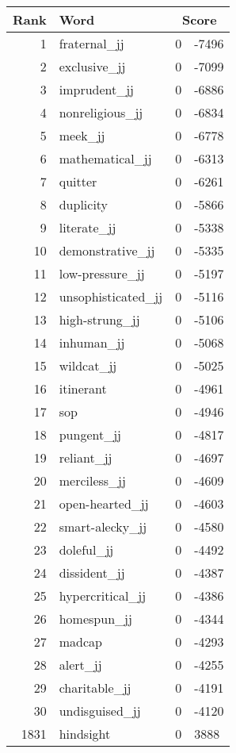 \begin{longtable}[!htbp]{| rlr@{.}l |}
    \hline
    \textbf{Rank} & \textbf{Word} & \multicolumn{2}{c|}{\textbf{Score}} \\
    \hline
    \endhead
    1 & fraternal\_jj & 0 & -7496 \\
    2 & exclusive\_jj & 0 & -7099 \\
    3 & imprudent\_jj & 0 & -6886 \\
    4 & nonreligious\_jj & 0 & -6834 \\
    5 & meek\_jj & 0 & -6778 \\
    6 & mathematical\_jj & 0 & -6313 \\
    7 & quitter & 0 & -6261 \\
    8 & duplicity & 0 & -5866 \\
    9 & literate\_jj & 0 & -5338 \\
    10 & demonstrative\_jj & 0 & -5335 \\
    11 & low-pressure\_jj & 0 & -5197 \\
    12 & unsophisticated\_jj & 0 & -5116 \\
    13 & high-strung\_jj & 0 & -5106 \\
    14 & inhuman\_jj & 0 & -5068 \\
    15 & wildcat\_jj & 0 & -5025 \\
    16 & itinerant & 0 & -4961 \\
    17 & sop & 0 & -4946 \\
    18 & pungent\_jj & 0 & -4817 \\
    19 & reliant\_jj & 0 & -4697 \\
    20 & merciless\_jj & 0 & -4609 \\
    21 & open-hearted\_jj & 0 & -4603 \\
    22 & smart-alecky\_jj & 0 & -4580 \\
    23 & doleful\_jj & 0 & -4492 \\
    24 & dissident\_jj & 0 & -4387 \\
    25 & hypercritical\_jj & 0 & -4386 \\
    26 & homespun\_jj & 0 & -4344 \\
    27 & madcap & 0 & -4293 \\
    28 & alert\_jj & 0 & -4255 \\
    29 & charitable\_jj & 0 & -4191 \\
    30 & undisguised\_jj & 0 & -4120 \\
    1831 & hindsight & 0 & 3888 \\

\end{longtable}
